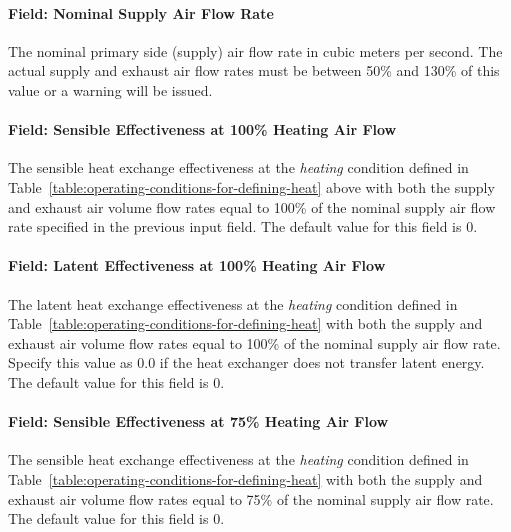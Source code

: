 \paragraph{Field: Nominal Supply Air Flow Rate}\label{field-nominal-supply-air-flow-rate-1}

The nominal primary side (supply) air flow rate in cubic meters per second. The actual supply and exhaust air flow rates must be between 50\% and 130\% of this value or a warning will be issued.

\paragraph{Field: Sensible Effectiveness at 100\% Heating Air Flow}\label{field-sensible-effectiveness-at-100-heating-air-flow}

The sensible heat exchange effectiveness at the \emph{heating} condition defined in Table~\ref{table:operating-conditions-for-defining-heat} above with both the supply and exhaust air volume flow rates equal to 100\% of the nominal supply air flow rate specified in the previous input field. The default value for this field is 0.

\paragraph{Field: Latent Effectiveness at 100\% Heating Air Flow}\label{field-latent-effectiveness-at-100-heating-air-flow}

The latent heat exchange effectiveness at the \emph{heating} condition defined in Table~\ref{table:operating-conditions-for-defining-heat} with both the supply and exhaust air volume flow rates equal to 100\% of the nominal supply air flow rate. Specify this value as 0.0 if the heat exchanger does not transfer latent energy. The default value for this field is 0.

\paragraph{Field: Sensible Effectiveness at 75\% Heating Air Flow}\label{field-sensible-effectiveness-at-75-heating-air-flow}

The sensible heat exchange effectiveness at the \emph{heating} condition defined in Table~\ref{table:operating-conditions-for-defining-heat} with both the supply and exhaust air volume flow rates equal to 75\% of the nominal supply air flow rate. The default value for this field is 0.

